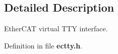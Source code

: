 \subsection{\-Detailed \-Description}
\-Ether\-C\-A\-T virtual \-T\-T\-Y interface. 

\-Definition in file {\bf ectty.\-h}.

